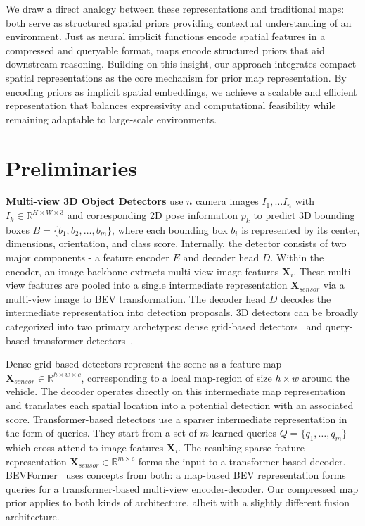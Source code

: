 \documentclass{article} %
\newcommand{\myparagraph}[1]{\vspace{0.2em}\noindent\textbf{#1}}
\newcommand{\xfeat}{\ensuremath{\mathbf{X}_{sensor}}}
\newcommand{\nameunder}{compressed\xspace}
\begin{document}
We draw a direct analogy between these representations and traditional maps: both serve as structured spatial priors providing contextual understanding of an environment.
Just as neural implicit functions encode spatial features in a compressed and queryable format, maps encode structured priors that aid downstream reasoning.
Building on this insight, our approach integrates compact spatial representations as the core mechanism for prior map representation.
By encoding priors as implicit spatial embeddings, we achieve a scalable and efficient representation that balances expressivity and computational feasibility while remaining adaptable to large-scale environments.


\section{Preliminaries}
\label{sec:preliminaries}

\myparagraph{Multi-view 3D Object Detectors} use $n$ camera images $I_1, \ldots I_n$ with $I_k \in \mathbb{R}^{H \times W \times 3 }$ and corresponding 2D pose information $p_k$ to predict 3D bounding boxes $B = \{b_1, b_2, \ldots, b_m\}$, where each bounding box $b_i$ is represented by its center, dimensions, orientation, and class score.
Internally, the detector consists of two major components - a feature encoder $E$ and decoder head $D$.
Within the encoder, an image backbone extracts multi-view image features $\mathbf{X}_i$.
These multi-view features are pooled into a single intermediate representation $\xfeat$ via a multi-view image to BEV transformation\cite{li2022bevformer,zhou2022cross}.
The decoder head $D$ decodes the intermediate representation into detection proposals.
3D detectors can be broadly categorized into two primary archetypes: dense grid-based detectors~\cite{huang2021bevdet,li2022bevformer,yang2022bevformer,liu2022bevfusion} and query-based transformer detectors~\cite{wang2022detr3d,liu2022petr,liu2022petrv2}.

Dense grid-based detectors represent the scene as a feature map $\xfeat \in \mathbb{R}^{h \times w \times c}$, corresponding to a local map-region of size $h \times w$ around the vehicle.
The decoder operates directly on this intermediate map representation and translates each spatial location into a potential detection with an associated score.
Transformer-based detectors use a sparser intermediate representation in the form of queries.
They start from a set of $m$ learned queries $Q=\{q_1,\ldots,q_m\}$ which cross-attend to image features $\mathbf{X}_i$.
The resulting sparse feature representation $\xfeat \in \mathbb{R}^{m \times c}$ forms the input to a transformer-based decoder.
BEVFormer~\cite{li2022bevformer} uses concepts from both: a map-based BEV representation forms queries for a transformer-based multi-view encoder-decoder.
Our \nameunder map prior applies to both kinds of architecture, albeit with a slightly different fusion architecture.
\end{document}
